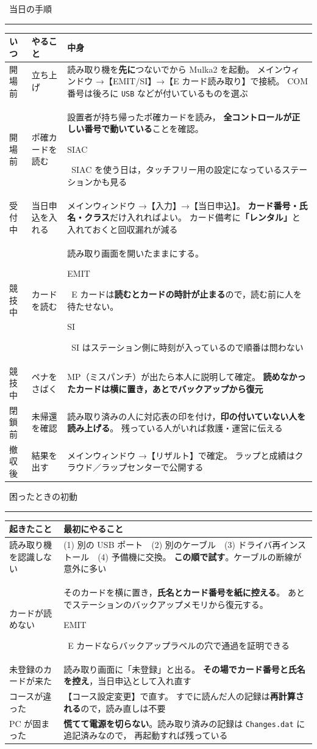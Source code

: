 \documentclass[a4paper,9pt]{ltjsarticle}
\DeclareRobustCommand{\tg}[2]{{\colorbox{#1}{\color{white}\sffamily\bfseries\scriptsize\strut #2}}}
\DeclareRobustCommand{\tSI}{\tg{cSI}{SI}}
\DeclareRobustCommand{\tEMIT}{\tg{cEMIT}{EMIT}}
\DeclareRobustCommand{\tSIAC}{\tg{cSIAC}{SIAC}}
\newcommand{\hd}[1]{\textbf{\sffamily #1}}
\newcommand{\Head}[1]{%
  \Needspace*{4\baselineskip}%
  \par\vspace{5pt}%
  \noindent\colorbox{boxln}{\color{white}\sffamily\bfseries\strut\ #1\ }\par
  \vspace{1pt}\noindent\textcolor{rulec}{\rule{\textwidth}{0.7pt}}\par\vspace{2pt}%
}
\begin{document}
\Head{当日の手順}

\begin{center}
\small
\begin{tabular}{@{}P{16mm}P{50mm}P{106mm}@{}}
\toprule
\hd{いつ} & \hd{やること} & \hd{中身} \\
\midrule
開場前 & 立ち上げ &
  読み取り機を\textbf{先に}つないでから Mulka2 を起動。
  メインウィンドウ →【EMIT/SI】→【E カード読み取り】で接続。
  COM 番号は後ろに \texttt{USB} などが付いているものを選ぶ \\
開場前 & ポ確カードを読む &
  設置者が持ち帰ったポ確カードを読み，
  \textbf{全コントロールが正しい番号で動いている}ことを確認。
  \tSIAC\ SIAC を使う日は，タッチフリー用の設定になっているステーションかも見る \\
受付中 & 当日申込を入れる &
  メインウィンドウ →【入力】→【当日申込】。
  \textbf{カード番号・氏名・クラス}だけ入れればよい。
  カード備考に\textbf{「レンタル」}と入れておくと回収漏れが減る \\
競技中 & カードを読む &
  読み取り画面を開いたままにする。
  \tEMIT\ E カードは\textbf{読むとカードの時計が止まる}ので，読む前に人を待たせない。
  \tSI\ SI はステーション側に時刻が入っているので順番は問わない \\
競技中 & ペナをさばく &
  MP（ミスパンチ）が出たら本人に説明して確定。
  \textbf{読めなかったカードは横に置き，あとでバックアップから復元} \\
閉鎖前 & 未帰還を確認 &
  読み取り済みの人に対応表の印を付け，\textbf{印の付いていない人を読み上げる}。
  残っている人がいれば救護・運営に伝える \\
撤収後 & 結果を出す &
  メインウィンドウ →【リザルト】で確定。
  ラップと成績はクラウド／ラップセンターで公開する \\
\bottomrule
\end{tabular}
\end{center}

\Head{困ったときの初動}

\begin{center}
\small
\begin{tabular}{@{}P{44mm}P{128mm}@{}}
\toprule
\hd{起きたこと} & \hd{最初にやること} \\
\midrule
読み取り機を認識しない &
  (1) 別の USB ポート　(2) 別のケーブル　(3) ドライバ再インストール　(4) 予備機に交換。
  \textbf{この順で試す}。ケーブルの断線が意外に多い \\
カードが読めない &
  そのカードを横に置き，\textbf{氏名とカード番号を紙に控える}。
  あとでステーションのバックアップメモリから復元する。
  \tEMIT\ E カードならバックアップラベルの穴で通過を証明できる \\
未登録のカードが来た &
  読み取り画面に「未登録」と出る。
  \textbf{その場でカード番号と氏名を控え}，当日申込として入れ直す \\
コースが違った &
  【コース設定変更】で直す。
  すでに読んだ人の記録は\textbf{再計算される}ので，読み直しは不要 \\
PC が固まった &
  \textbf{慌てて電源を切らない}。読み取り済みの記録は \texttt{Changes.dat} に追記済みなので，
  再起動すれば残っている \\
\bottomrule
\end{tabular}
\end{center}
\end{document}
